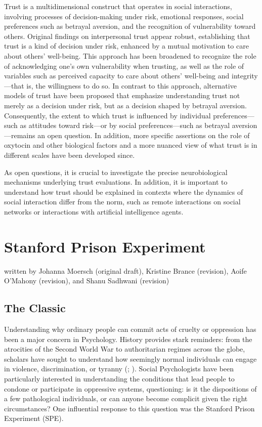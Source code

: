 \documentclass[
  letterpaper,
]{book}
\begin{document}
Trust is a multidimensional construct that operates in social
interactions, involving processes of decision-making under risk,
emotional responses, social preferences such as betrayal aversion, and
the recognition of vulnerability toward others. Original findings on
interpersonal trust appear robust, establishing that trust is a kind of
decision under risk, enhanced by a mutual motivation to care about
others' well-being. This approach has been broadened to recognize the
role of acknowledging one's own vulnerability when trusting, as well as
the role of variables such as perceived capacity to care about others'
well-being and integrity---that is, the willingness to do so. In
contrast to this approach, alternative models of trust have been
proposed that emphasize understanding trust not merely as a decision
under risk, but as a decision shaped by betrayal aversion. Consequently,
the extent to which trust is influenced by individual preferences---such
as attitudes toward risk---or by social preferences---such as betrayal
aversion---remains an open question. In addition, more specific
assertions on the role of oxytocin and other biological factors and a
more nuanced view of what trust is in different scales have been
developed since.

As open questions, it is crucial to investigate the precise
neurobiological mechanisms underlying trust evaluations. In addition, it
is important to understand how trust should be explained in contexts
where the dynamics of social interaction differ from the norm, such as
remote interactions on social networks or interactions with artificial
intelligence agents.


\chapter{\texorpdfstring{{Stanford Prison
Experiment}}{Stanford Prison Experiment}}\label{stanford-prison-experiment}

{written by Johanna Moersch (original draft), Kristine Brance
(revision), Aoife O'Mahony (revision), and Shanu Sadhwani (revision)}

\section{The Classic}\label{the-classic-12}

Understanding why ordinary people can commit acts of cruelty or
oppression has been a major concern in Psychology. History provides
stark reminders: from the atrocities of the Second World War to
authoritarian regimes across the globe, scholars have sought to
understand how seemingly normal individuals can engage in violence,
discrimination, or tyranny
(;
). Social Psychologists have
been particularly interested in understanding the conditions that lead
people to condone or participate in oppressive systems, questioning: is
it the dispositions of a few pathological individuals, or can anyone
become complicit given the right circumstances? One influential response
to this question was the Stanford Prison Experiment (SPE).
\end{document}
